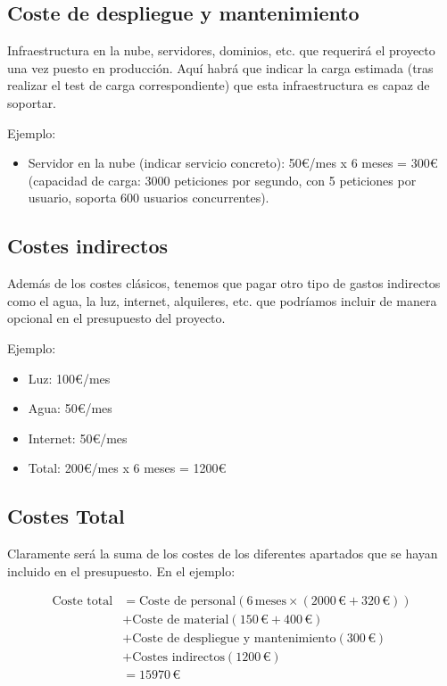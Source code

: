 \subsection{Coste de despliegue y mantenimiento}

Infraestructura en la nube, servidores, dominios, etc. que requerirá el proyecto una vez puesto en producción. Aquí habrá que indicar la carga estimada (tras realizar el test de carga correspondiente) que esta infraestructura es capaz de soportar.

Ejemplo:
\begin{itemize}
\item Servidor en la nube (indicar servicio concreto): 50€/mes x 6 meses = 300€ (capacidad de carga: 3000 peticiones por segundo, con 5 peticiones por usuario, soporta 600 usuarios concurrentes).
\end{itemize}
        
\subsection{Costes indirectos}

Además de los costes clásicos, tenemos que pagar otro tipo de gastos indirectos como el agua, la luz, internet, alquileres, etc. que podríamos incluir de manera opcional en el presupuesto del proyecto.

Ejemplo:
\begin{itemize}
    \item Luz: 100€/mes
    \item Agua: 50€/mes 
    \item Internet: 50€/mes
    \item Total: 200€/mes x 6 meses = 1200€
\end{itemize}
\subsection{Costes Total}
Claramente será la suma de los costes de los diferentes apartados que se hayan incluido en el presupuesto. En el ejemplo:

\begin{equation}
\begin{split}
    \text{Coste total} &= \text{Coste de personal} \left(6 \, \text{meses} \times (2000\,\text{€} + 320\,\text{€})\right) \\
    &+ \text{Coste de material} (150\,\text{€} + 400\,\text{€}) \\
    &+ \text{Coste de despliegue y mantenimiento} (300\,\text{€}) \\
    &+ \text{Costes indirectos} (1200\,\text{€}) \\
    &= 15970\,\text{€}
\end{split}
\end{equation}

